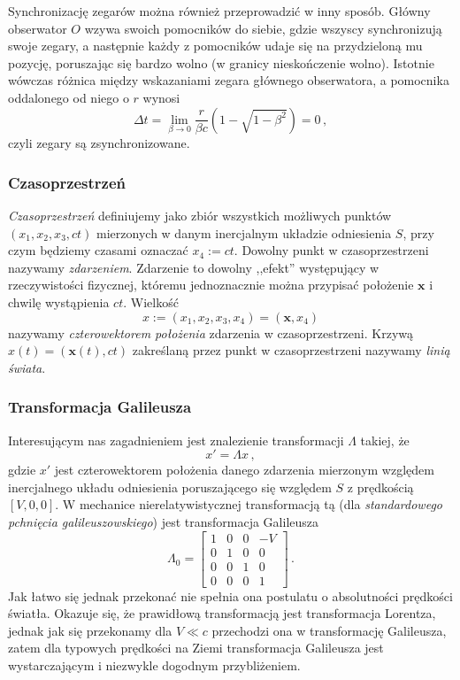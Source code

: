 \documentclass[../main.tex]{subfiles}
\begin{document}
Synchronizację zegarów można również przeprowadzić w inny sposób. Główny obserwator \(O\) wzywa swoich pomocników do siebie, gdzie wszyscy synchronizują swoje zegary, a następnie każdy z pomocników udaje się na przydzieloną mu pozycję, poruszając się bardzo wolno (w granicy nieskończenie wolno). Istotnie wówczas różnica między wskazaniami zegara głównego obserwatora, a pomocnika oddalonego od niego o \(r\) wynosi
\begin{equation*}
    \Delta t=\lim_{\beta\to0}\frac{r}{\beta c}\left(1-\sqrt{1-\beta^2}\right)=0\,,
\end{equation*}
czyli zegary są zsynchronizowane.
\subsubsection{Czasoprzestrzeń}
\textit{Czasoprzestrzeń} definiujemy jako zbiór wszystkich możliwych punktów \((x_1,x_2,x_3,ct)\) mierzonych w danym inercjalnym układzie odniesienia \(S\), przy czym będziemy czasami oznaczać \(x_4:=ct\). Dowolny punkt w czasoprzestrzeni nazywamy \textit{zdarzeniem}. Zdarzenie to dowolny ,,efekt'' występujący w rzeczywistości fizycznej, któremu jednoznacznie można przypisać położenie \(\mathbf{x}\) i chwilę wystąpienia \(ct\). Wielkość
\begin{equation*}
    x:=(x_1,x_2,x_3,x_4)=(\mathbf{x},x_4)
\end{equation*}
nazywamy \textit{czterowektorem położenia} zdarzenia w czasoprzestrzeni. Krzywą \(x(t)=(\mathbf{x}(t),ct)\) zakreślaną przez punkt w czasoprzestrzeni nazywamy \textit{linią świata}.
\subsubsection{Transformacja Galileusza}
Interesującym nas zagadnieniem jest znalezienie transformacji \(\Lambda\) takiej, że
\begin{equation*}
    x'=\Lambda x\,,
\end{equation*}
gdzie \(x'\) jest czterowektorem położenia danego zdarzenia mierzonym względem inercjalnego układu odniesienia poruszającego się względem \(S\) z prędkością \([V,0,0]\). W mechanice nierelatywistycznej transformacją tą (dla \textit{standardowego pchnięcia galileuszowskiego}) jest transformacja Galileusza
\begin{equation*}
    \Lambda_0=\left[\begin{array}{cccc}
         1&0&0&-V  \\
         0&1&0&0  \\
         0&0&1&0  \\
         0&0&0&1  
    \end{array}\right]\,.
\end{equation*}
Jak łatwo się jednak przekonać nie spełnia ona postulatu o absolutności prędkości światła. Okazuje się, że prawidłową transformacją jest transformacja Lorentza, jednak jak się przekonamy dla \(V\ll c\) przechodzi ona w transformację Galileusza, zatem dla typowych prędkości na Ziemi transformacja Galileusza jest wystarczającym i niezwykle dogodnym przybliżeniem.
\end{document}
